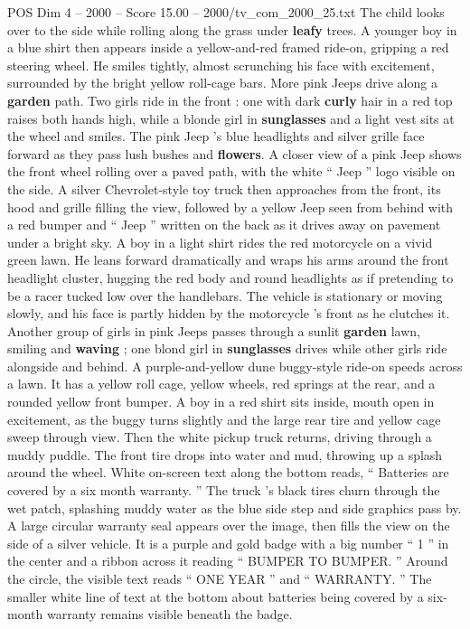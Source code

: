 \begin{textsample}{POS Dim 4 – 2000 – Score 15.00 – 2000/tv\_com\_2000\_25.txt}
The child looks over to the side while rolling along the grass under \textbf{leafy} trees.
A younger boy in a blue shirt then appears inside a yellow-and-red framed ride-on, gripping a red steering wheel.
He smiles tightly, almost scrunching his face with excitement, surrounded by the bright yellow roll-cage bars.
More pink Jeeps drive along a \textbf{garden} path.
Two girls ride in the front : one with dark \textbf{curly} hair in a red top raises both hands high, while a blonde girl in \textbf{sunglasses} and a light vest sits at the wheel and smiles.
The pink Jeep ’s blue headlights and silver grille face forward as they pass lush bushes and \textbf{flowers}.
A closer view of a pink Jeep shows the front wheel rolling over a paved path, with the white “ Jeep ” logo visible on the side.
A silver Chevrolet-style toy truck then approaches from the front, its hood and grille filling the view, followed by a yellow Jeep seen from behind with a red bumper and “ Jeep ” written on the back as it drives away on pavement under a bright sky.
A boy in a light shirt rides the red motorcycle on a vivid green lawn.
He leans forward dramatically and wraps his arms around the front headlight cluster, hugging the red body and round headlights as if pretending to be a racer tucked low over the handlebars.
The vehicle is stationary or moving slowly, and his face is partly hidden by the motorcycle ’s front as he clutches it.
Another group of girls in pink Jeeps passes through a sunlit \textbf{garden} lawn, smiling and \textbf{waving} ; one blond girl in \textbf{sunglasses} drives while other girls ride alongside and behind.
A purple-and-yellow dune buggy-style ride-on speeds across a lawn.
It has a yellow roll cage, yellow wheels, red springs at the rear, and a rounded yellow front bumper.
A boy in a red shirt sits inside, mouth open in excitement, as the buggy turns slightly and the large rear tire and yellow cage sweep through view.
Then the white pickup truck returns, driving through a muddy puddle.
The front tire drops into water and mud, throwing up a splash around the wheel.
White on-screen text along the bottom reads, “ Batteries are covered by a six month warranty. ” The truck ’s black tires churn through the wet patch, splashing muddy water as the blue side step and side graphics pass by.
A large circular warranty seal appears over the image, then fills the view on the side of a silver vehicle.
It is a purple and gold badge with a big number “ 1 ” in the center and a ribbon across it reading “ BUMPER TO BUMPER. ” Around the circle, the visible text reads “ ONE YEAR ” and “ WARRANTY. ” The smaller white line of text at the bottom about batteries being covered by a six-month warranty remains visible beneath the badge.

\end{textsample}
